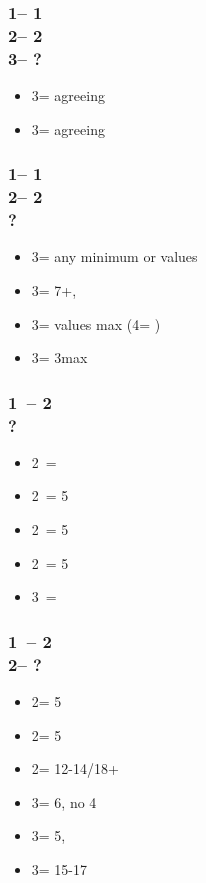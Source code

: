 \documentclass[12pt, a4paper]{article}
\begin{document}
\subsubsection*{1\diams -- 1\spades\\
                2\diams -- 2\hearts \\
                3\clubs -- ?}
\begin{itemize}
    \item 3\diams = agreeing \diams
    \item 3\hearts = agreeing \hearts
\end{itemize}

\subsubsection*{1\diams -- 1\spades\\
                2\diams -- 2\nt \\ ?}
\begin{itemize}
    \item 3\clubs = any minimum or \clubs values
    \item 3\diams = 7+\diams, \gf
    \item 3\hearts = \hearts values max (4\diams = \nf)
    \item 3\spades = 3\spades max
\end{itemize}

\subsubsection*{1\clubs\ -- 2\clubs \\ ?}
\begin{itemize}
    \item 2\diams\ = \bal
    \item 2\hearts\ = 5\hearts\ \unbal
    \item 2\spades\ = 5\spades\ \unbal
    \item 2\nt\ = 5\diams\ \unbal
    \item 3\clubs\ = \clubs\ \unbal
\end{itemize}

\subsubsection*{1\clubs\ -- 2\clubs \\
                2\diams -- ?}
\begin{itemize}
    \item 2\hearts = 5\hearts\ \unbal
    \item 2\spades = 5\spades\ \unbal
    \item 2\nt = 12-14/18+ \bal
    \item 3\clubs = 6\clubs, no 4\major
    \item 3\diams = 5\diams, \gf
    \item 3\nt = 15-17 \bal
\end{itemize}
\end{document}
